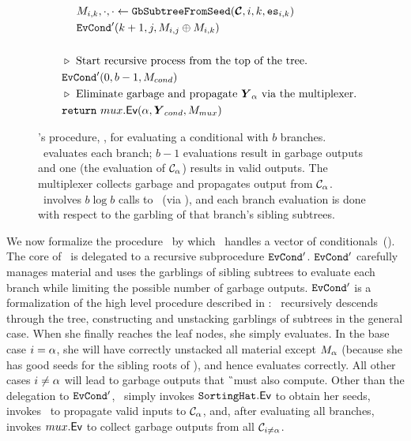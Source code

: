 \begin{figure}
\begin{align*}
    &~~~~~~\mat_{i, k}, \cdot, \cdot \gets \gbtree(\vec{\cir}, i, k, \es_{i,k})\\
    &~~~~~~\evcond'(k+1, j, \mat_{i, j} \oplus \mat_{i, k})\\
    \\
    &~~\codecomment{Start recursive process from the top of the tree.}\\
    &~~\evcond'(0, b-1, M_{cond})\\
    &~~\codecomment{Eliminate garbage and propagate $\vec{Y}_\aid$ via
    the multiplexer.}\\
    &~~\creturn~\evmux(\aid, \vec{Y}_{cond}, M_{mux})
  \end{align*}
  \caption{%
    \E's procedure, \evcond, for evaluating a conditional with $b$ branches.
    \evcond\ evaluates each branch; $b-1$ evaluations
    result in garbage outputs and one (the evaluation of
    $\mathcal C_{\alpha}$) results in valid outputs.
    The multiplexer collects garbage and propagates output from
    $\mathcal C_{\alpha}$.
    \evcond\ involves $b \log b$ calls to \gGb\ (via \gbtree), and each
    branch evaluation is done with respect to the garbling of that
    branch's sibling subtrees.
  }\label{fig:evcond}
\end{figure}

We now formalize the procedure \evcond\ by which \E\ handles a vector of
conditionals~().
%
The core of \evcond\ is delegated to a recursive subprocedure $\mathtt{EvCond}'$.
$\mathtt{EvCond}'$ carefully manages material and uses the garblings of sibling
subtrees to evaluate each branch while limiting the possible number of
garbage outputs.
$\mathtt{EvCond}'$ is a formalization of the high level procedure described in
: \E\ recursively descends through the tree,
constructing and unstacking garblings of subtrees in the general case.
%
When she finally reaches the leaf nodes, she simply evaluates.
%
In the base case $i = \alpha$, she will have correctly unstacked all
material except $M_{\alpha}$ (because she has good seeds for the
sibling roots of \aid), and hence evaluates correctly.
%
All other cases $i \neq \alpha$ will lead to garbage outputs that \G\
must also compute.
Other than the delegation to $\mathtt{EvCond}'$, \evcond\ simply invokes $\mathtt{SortingHat}.\textsf{Ev}$
to obtain her seeds, invokes \evdem\ to propagate valid inputs to $\mathcal C_{\alpha}$,
and, after evaluating all branches, invokes $mux.\textsf{Ev}$ to collect
garbage outputs from all $\mathcal C_{i \neq \alpha}$.
%

